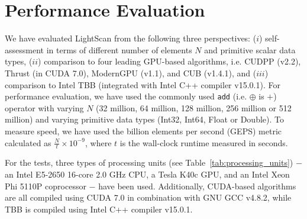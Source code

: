 \documentclass[article]{elsarticle}
\begin{document}
{\section{Performance Evaluation}
\label{sec:results}
We have evaluated LightScan from the following three perspectives: ($i$) self-assessment in terms of different number of elements $N$ and primitive scalar data types, ($ii$) comparison to four leading GPU-based algorithms, i.e. CUDPP (v2.2), Thrust (in CUDA 7.0), ModernGPU (v1.1), and CUB (v1.4.1), and ($iii$) comparison to Intel TBB (integrated with Intel C++ compiler v15.0.1). For performance evaluation, we have used the commonly used {\tt add} (i.e. $\oplus$ is $+$) operator with varying $N$ (32 million, 64 million, 128 million, 256 million or 512 million) and varying primitive data types (Int32, Int64, Float or Double). To measure speed, we have used the billion elements per second (GEPS) metric calculated as \mbox{$\frac{N}{t}\times 10^{-9}$}, where $t$ is the wall-clock runtime measured in seconds. 

For the tests, three types of processing units (see Table~\ref{tab:processing_units}) $-$ an Intel E5-2650 16-core 2.0 GHz CPU, a Tesla K40c GPU, and an Intel Xeon Phi 5110P coprocessor $-$ have been used. Additionally, CUDA-based algorithms are all compiled using CUDA 7.0 in combination with GNU GCC v4.8.2, while TBB is compiled using Intel C++ compiler v15.0.1.

}
\end{document}
